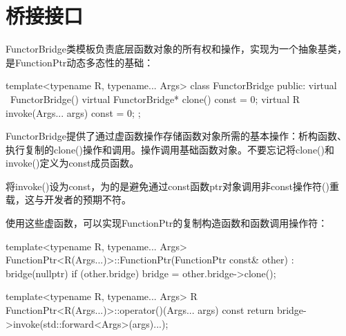 \section{桥接接口}
FunctorBridge类模板负责底层函数对象的所有权和操作，实现为一个抽象基类，是FunctionPtr动态多态性的基础：

\begin{cpp}
template<typename R, typename... Args>
class FunctorBridge {
	public:
	virtual ~FunctorBridge() {
	}
	virtual FunctorBridge* clone() const = 0;
	virtual R invoke(Args... args) const = 0;
};
\end{cpp}

FunctorBridge提供了通过虚函数操作存储函数对象所需的基本操作：析构函数、执行复制的clone()操作和调用。操作调用基础函数对象。不要忘记将clone()和invoke()定义为const成员函数。

\begin{notice}
将invoke()设为const，为的是避免通过const函数ptr对象调用非const操作符()重载，这与开发者的预期不符。
\end{notice}

使用这些虚函数，可以实现FunctionPtr的复制构造函数和函数调用操作符：

\begin{cpp}
template<typename R, typename... Args>
FunctionPtr<R(Args...)>::FunctionPtr(FunctionPtr const& other)
: bridge(nullptr) {
	if (other.bridge) {
		bridge = other.bridge->clone();
	}
}

template<typename R, typename... Args>
R FunctionPtr<R(Args...)>::operator()(Args... args) const {
	return bridge->invoke(std::forward<Args>(args)...);
}
\end{cpp}














































